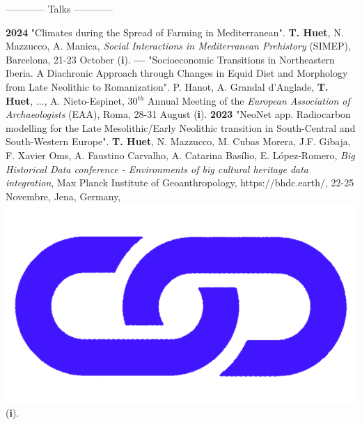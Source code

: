 \documentclass{article}
\newcommand{\fr}[1]{}       %
\newcommand{\en}[1]{#1}     %
\begin{document}
\begin{center}
\fr{------------ Communications ------------}
\en{------------ Talks ------------}
\end{center} 
\smallbreak
\textbf{2024 }"Climates during the Spread of Farming in Mediterranean". \textbf{T. Huet}, N. Mazzucco, A. Manica, \textit{Social Interactions in Mediterranean Prehistory} (SIMEP), Barcelona, 21-23 October (\textbf{i}).
\smallbreak
\textbf{--- }"Socioeconomic Transitions in Northeastern Iberia. A Diachronic Approach through Changes in Equid Diet and Morphology from Late Neolithic to Romanization". P. Hanot, A. Grandal d'Anglade, \textbf{T. Huet}, ..., A. Nieto-Espinet, 30${}^{th}$ Annual Meeting of the \textit{European Association of Archaeologists} (EAA), Roma, 28-31 August (\textbf{i}).
\smallbreak
\textbf{2023 }"NeoNet app. Radiocarbon modelling for the Late Mesolithic/Early Neolithic transition in South-Central and South-Western Europe". \textbf{T. Huet}, N. Mazzucco, M. Cubas Morera, J.F. Gibaja, F. Xavier Oms, A. Faustino Carvalho, A. Catarina Basílio, E. López-Romero, \textit{Big Historical Data conference - Environments of big cultural heritage data integration}, Max Planck Institute of Geoanthropology, https://bhdc.earth/, 22-25 Novembre, Jena, Germany,  \href{https://zoometh.github.io/neonet/doc/talks/2023-bhdc}{\includegraphics[scale=0.015]{link_darkblue.png}} (\textbf{i}).
\smallbreak
\end{document}
